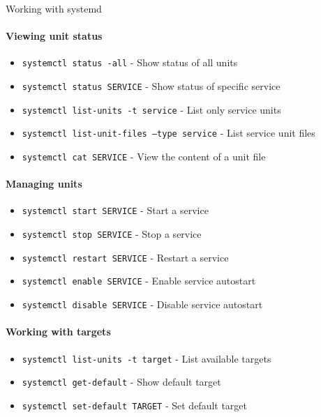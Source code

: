 \multend

\begin{KR}{Working with systemd}
    \paragraph{Viewing unit status}
    \begin{itemize}
        \item \texttt{systemctl status -all} - Show status of all units
        \item \texttt{systemctl status SERVICE} - Show status of specific service
        \item \texttt{systemctl list-units -t service} - List only service units
        \item \texttt{systemctl list-unit-files --type service} - List service unit files
        \item \texttt{systemctl cat SERVICE} - View the content of a unit file
    \end{itemize}
    
    \paragraph{Managing units}
    \begin{itemize}
        \item \texttt{systemctl start SERVICE} - Start a service
        \item \texttt{systemctl stop SERVICE} - Stop a service
        \item \texttt{systemctl restart SERVICE} - Restart a service
        \item \texttt{systemctl enable SERVICE} - Enable service autostart
        \item \texttt{systemctl disable SERVICE} - Disable service autostart
    \end{itemize}
    
    \paragraph{Working with targets}
    \begin{itemize}
        \item \texttt{systemctl list-units -t target} - List available targets
        \item \texttt{systemctl get-default} - Show default target
        \item \texttt{systemctl set-default TARGET} - Set default target
    \end{itemize}
\end{KR}

